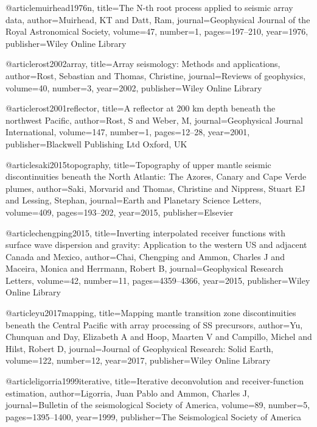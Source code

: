 @article{muirhead1976n,
  title={The N-th root process applied to seismic array data},
  author={Muirhead, KT and Datt, Ram},
  journal={Geophysical Journal of the Royal Astronomical Society},
  volume={47},
  number={1},
  pages={197--210},
  year={1976},
  publisher={Wiley Online Library}
}

@article{rost2002array,
  title={Array seismology: Methods and applications},
  author={Rost, Sebastian and Thomas, Christine},
  journal={Reviews of geophysics},
  volume={40},
  number={3},
  year={2002},
  publisher={Wiley Online Library}
}

@article{rost2001reflector,
  title={A reflector at 200 km depth beneath the northwest Pacific},
  author={Rost, S and Weber, M},
  journal={Geophysical Journal International},
  volume={147},
  number={1},
  pages={12--28},
  year={2001},
  publisher={Blackwell Publishing Ltd Oxford, UK}
}

@article{saki2015topography,
  title={Topography of upper mantle seismic discontinuities beneath the North Atlantic: The Azores, Canary and Cape Verde plumes},
  author={Saki, Morvarid and Thomas, Christine and Nippress, Stuart EJ and Lessing, Stephan},
  journal={Earth and Planetary Science Letters},
  volume={409},
  pages={193--202},
  year={2015},
  publisher={Elsevier}
}

@article{chengping2015,
  title={Inverting interpolated receiver functions with surface wave dispersion and gravity: Application to the western US and adjacent Canada and Mexico},
  author={Chai, Chengping and Ammon, Charles J and Maceira, Monica and Herrmann, Robert B},
  journal={Geophysical Research Letters},
  volume={42},
  number={11},
  pages={4359--4366},
  year={2015},
  publisher={Wiley Online Library}
}

@article{yu2017mapping,
  title={Mapping mantle transition zone discontinuities beneath the Central Pacific with array processing of SS precursors},
  author={Yu, Chunquan and Day, Elizabeth A and Hoop, Maarten V and Campillo, Michel and Hilst, Robert D},
  journal={Journal of Geophysical Research: Solid Earth},
  volume={122},
  number={12},
  year={2017},
  publisher={Wiley Online Library}
}

@article{ligorria1999iterative,
  title={Iterative deconvolution and receiver-function estimation},
  author={Ligorria, Juan Pablo and Ammon, Charles J},
  journal={Bulletin of the seismological Society of America},
  volume={89},
  number={5},
  pages={1395--1400},
  year={1999},
  publisher={The Seismological Society of America}
}

